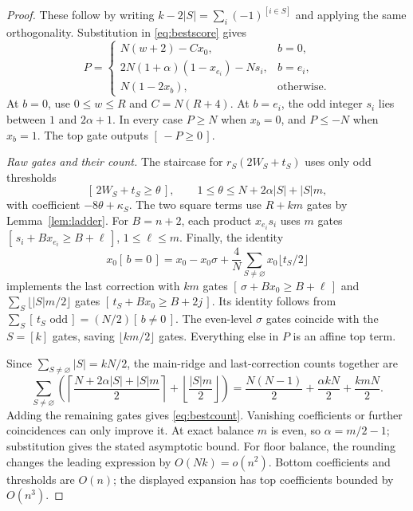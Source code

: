 \documentclass[11pt]{article}
\newcommand{\ind}[1]{[\,#1\,]}
\begin{document}
\begin{proof}
These follow by writing $k-2|S|=\sum_i(-1)^{[i\in S]}$ and applying the
same orthogonality. Substitution in \eqref{eq:bestscore} gives
\begin{equation}\label{eq:bestclosed}
P=\begin{cases}
N(w+2)-Cx_0,&b=0,\\
2N(1+\alpha)(1-x_{e_i})-Ns_i,&b=e_i,\\
N(1-2x_b),&\text{otherwise}.
\end{cases}
\end{equation}
At $b=0$, use $0\le w\le R$ and $C=N(R+4)$. At $b=e_i$, the odd
integer $s_i$ lies between $1$ and $2\alpha+1$. In every case $P\ge N$
when $x_b=0$, and $P\le-N$ when $x_b=1$. The top gate outputs $\ind{-P\ge0}$.

\emph{Raw gates and their count.}
The staircase for $r_S(2W_S+t_S)$ uses only odd thresholds
$$
\ind{2W_S+t_S\ge\theta},\qquad
1\le\theta\le N+2\alpha|S|+|S|m,
$$
with coefficient $-8\theta+\kappa_S$. The two square terms use $R+km$
gates by Lemma~\ref{lem:ladder}. For $B=n+2$, each product $x_{e_i}s_i$
uses $m$ gates $\ind{s_i+Bx_{e_i}\ge B+\ell}$, $1\le\ell\le m$.
Finally, the identity
$$
x_0\ind{b=0}=x_0-x_0\sigma+
 \frac4N\sum_{S\ne\varnothing}x_0\lfloor t_S/2\rfloor
$$
implements the last correction with $km$ gates
$\ind{\sigma+Bx_0\ge B+\ell}$ and
$\sum_S\lfloor |S|m/2\rfloor$ gates
$\ind{t_S+Bx_0\ge B+2j}$. Its identity follows from
$\sum_S\ind{t_S\text{ odd}}=(N/2)\ind{b\ne0}$.
The even-level $\sigma$ gates coincide with the $S=[k]$ gates, saving
$\lfloor km/2\rfloor$ gates. Everything else in $P$ is an affine top term.

Since $\sum_{S\ne\varnothing}|S|=kN/2$, the main-ridge and last-correction
counts together are
$$
\sum_{S\ne\varnothing}\left(
 \left\lceil\frac{N+2\alpha|S|+|S|m}{2}\right\rceil
 +\left\lfloor\frac{|S|m}{2}\right\rfloor\right)
 =\frac{N(N-1)}2+\frac{\alpha kN}2+\frac{kmN}2.
$$
Adding the remaining gates gives \eqref{eq:bestcount}. Vanishing coefficients
or further coincidences can only improve it. At exact balance $m$ is even,
so $\alpha=m/2-1$; substitution gives the stated asymptotic bound.
For floor balance, the rounding changes the leading expression by
$O(Nk)=o(n^2)$. Bottom coefficients and thresholds are $O(n)$; the displayed
expansion has top coefficients bounded by $O(n^3)$.
\end{proof}
\end{document}
